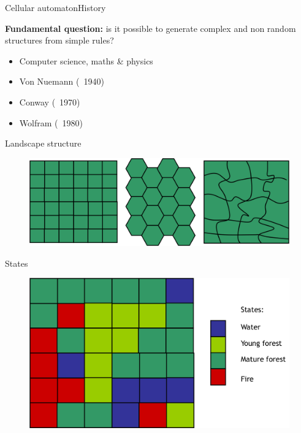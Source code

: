 \documentclass{eecslides}
\begin{document}

	\begin{frame}{Cellular automaton}{History}
	
	\textbf{Fundamental question:} is it possible to generate complex and non random structures from simple rules?

		\begin{itemize}
			\item Computer science, maths \& physics
			\item Von Nuemann (~1940)
			\item Conway (~1970)
			\item Wolfram (~1980)
		\end{itemize}
	\end{frame}

	\begin{frame}{Landscape structure}

		\begin{figure}[!t]
			\includegraphics[height=0.35\textheight]{landscape_types}
		\end{figure}

	\end{frame}


	\begin{frame}{States}

		\begin{figure}[!t]
			\includegraphics[height=0.55\textheight]{states}
		\end{figure}

	\end{frame}
\end{document}
